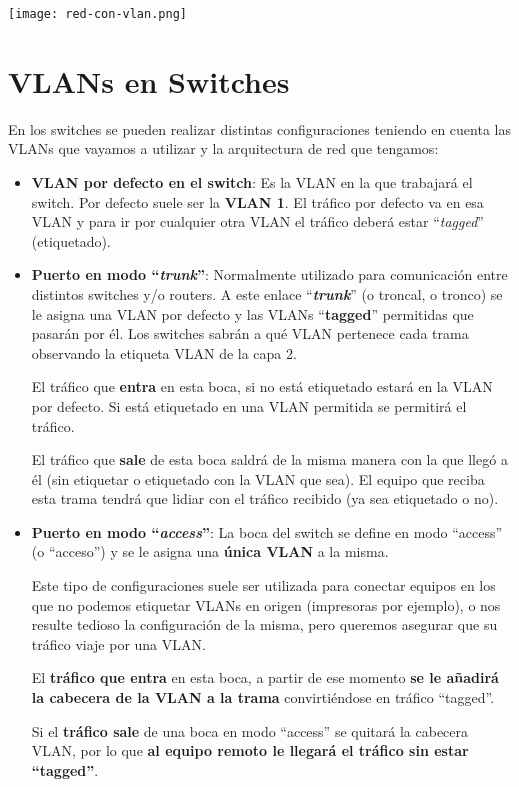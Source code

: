 \begin{center}
    \vspace{-15pt}
    \texttt{[image: red-con-vlan.png]}
    \vspace{-15pt}
\end{center}

\section{VLANs en Switches}

En los switches se pueden realizar distintas configuraciones teniendo en cuenta las VLANs que vayamos a utilizar y la arquitectura de red que tengamos:

\begin{itemize}
    \item \textbf{VLAN por defecto en el switch}: Es la VLAN en la que trabajará el switch. Por defecto suele ser la \textbf{VLAN 1}. El tráfico por defecto va en esa VLAN y para ir por cualquier otra VLAN el tráfico deberá estar “\textit{tagged}” (etiquetado).

    \hypertarget{puerto_trunk}{}
    \item \textbf{Puerto en modo “\textit{trunk}”}: Normalmente utilizado para comunicación entre distintos switches y/o routers. A este enlace “\textbf{\textit{trunk}}” (o troncal, o tronco) se le asigna una VLAN por defecto y las VLANs “\textbf{tagged}” permitidas que pasarán por él. Los switches sabrán a qué VLAN pertenece cada trama observando la etiqueta VLAN de la capa 2.

    El tráfico que \textbf{entra} en esta boca, si no está etiquetado estará en la VLAN por defecto. Si está etiquetado en una VLAN permitida se permitirá el tráfico.

    El tráfico que \textbf{sale} de esta boca saldrá de la misma manera con la que llegó a él (sin etiquetar o etiquetado con la VLAN que sea). El equipo que reciba esta trama tendrá que lidiar con el tráfico recibido (ya sea etiquetado o no).

    \hypertarget{puerto_access}{}
    \item \textbf{Puerto en modo “\textit{access}”}: La boca del switch se define en modo “access” (o “acceso”) y se le asigna una \textbf{única VLAN} a la misma.

    Este tipo de configuraciones suele ser utilizada para conectar equipos en los que no podemos etiquetar VLANs en origen (impresoras por ejemplo), o nos resulte tedioso la configuración de la misma, pero queremos asegurar que su tráfico viaje por una VLAN.

    El \textbf{tráfico que entra} en esta boca, a partir de ese momento \textbf{se le añadirá la cabecera de la VLAN a la trama} convirtiéndose en tráfico “tagged”.

    Si el \textbf{tráfico sale} de una boca en modo “access” se quitará la cabecera VLAN, por lo que \textbf{al equipo remoto le llegará el tráfico sin estar “tagged”}.

\end{itemize}

